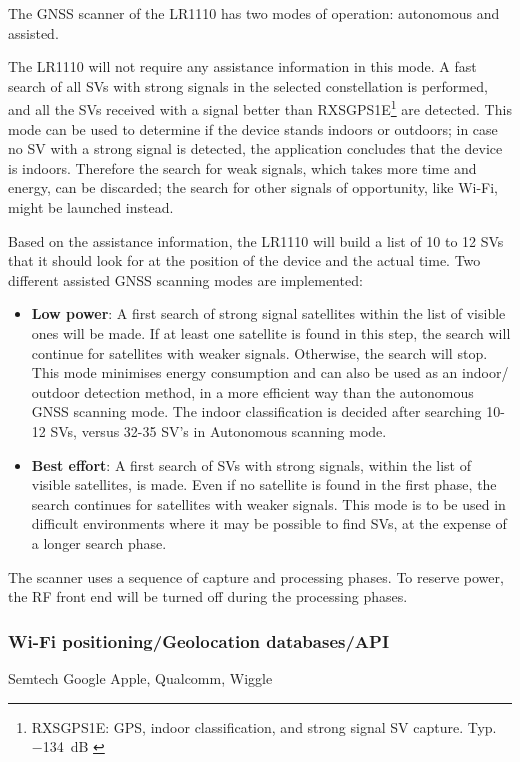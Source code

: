 The \ac{GNSS} scanner of the LR1110 has two modes of operation: autonomous and assisted.

The LR1110 will not require any assistance information in this mode. A fast search of all \ac{SV}s with strong signals in the selected constellation is performed, and all the \ac{SV}s received with a signal better than RXSGPS1E\footnote{RXSGPS1E: GPS, indoor classification, and strong signal \ac{SV} capture. Typ. \SI{-134}{\dB} \cite{LR1110_datasheet}} are detected.
This mode can be used to determine if the device stands indoors or outdoors; in case no \ac{SV} with a strong signal is detected, the application concludes that the device is indoors. Therefore the search for weak signals, which takes more time and energy, can be discarded; the search for other signals of opportunity, like Wi-Fi, might be launched instead.

Based on the assistance information, the LR1110 will build a list of 10 to 12 \ac{SV}s that it should look for at the position of the device and the actual time.
Two different assisted \ac{GNSS} scanning modes are implemented:
\begin{itemize}
\item \textbf{Low power}: A first search of strong signal satellites within the list of visible ones will be made. If at least one satellite is found in this step, the search will continue for satellites with weaker signals. Otherwise, the search will stop. This mode minimises energy consumption and can also be used as an indoor/ outdoor detection method, in a more efficient way than the autonomous \ac{GNSS} scanning mode. The indoor classification is decided after searching 10-12 \ac{SV}s, versus 32-35 \ac{SV}'s in Autonomous scanning mode.
\item \textbf{Best effort}: A first search of \ac{SV}s with strong signals, within the list of visible satellites, is made. Even if no satellite is found in the first phase, the search continues for satellites with weaker signals. This mode is to be used in difficult environments where it may be possible to find \ac{SV}s, at the expense of a longer search phase.
\end{itemize}
The scanner uses a sequence of capture and processing phases. To reserve power, the \ac{RF} front end will be turned off during the processing phases.

\subsubsection{Wi-Fi positioning/Geolocation databases/API}
Semtech
Google
Apple, Qualcomm, Wiggle

